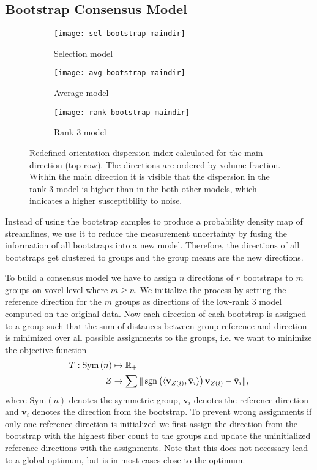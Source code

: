 \subsection{Bootstrap Consensus Model}
\begin{figure*}[t]
	\centering
	\begin{subfigure}[b]{0.33\linewidth}
		\texttt{[image: sel-bootstrap-maindir]}
		\caption{Selection model}
		
	\end{subfigure}
	\begin{subfigure}[b]{0.33\linewidth}
		\texttt{[image: avg-bootstrap-maindir]}
		\caption{Average model}
	\end{subfigure}
	\begin{subfigure}[b]{0.33\linewidth}
		\texttt{[image: rank-bootstrap-maindir]}
		\caption{Rank 3 model}
	\end{subfigure}

	\caption{Redefined orientation dispersion index calculated for the main
		direction (top row). The directions are ordered by volume fraction.
Within the main direction it is visible that the dispersion in the rank $3$
model is higher than in the both other models, which indicates a higher
susceptibility to noise. }
	\label{fig:dispersion}
\end{figure*}


Instead of using the bootstrap samples to produce a probability density map of
streamlines, we use it to reduce the measurement uncertainty by fusing the
information of all bootstraps into a new model. 
Therefore, the directions of all bootstraps get clustered to groups and the
group means are the new directions.

To build a consensus model we have to assign $n$ directions of $r$ bootstraps to $m$ groups on voxel
level where $m \geq n$. We initialize the process by setting the reference
direction for the $m$ groups as directions of
the low-rank $3$ model computed on the original data. Now each
direction of each bootstrap is assigned to a group such that the sum of
distances between group
reference and direction is minimized over all possible assignments to the
groups, i.e. we want to minimize the objective function 
\begin{align}
	T : \text{Sym} \left( n \right) & \mapsto \mathbb{R}_+ \nonumber \\
	Z & \rightarrow \sum \| \operatorname*{sgn} \left( \langle \mathbf{v}_{Z\left( i
	\right)}, \bar{\mathbf{v}}_i \rangle \right) \mathbf{v}_{Z\left( i
	\right)} - \bar{\mathbf{v}}_i\| ,  
\end{align} 
where $\text{Sym}\left( n \right)$ denotes the symmetric group, 
$\bar{\mathbf{v}}_i$ denotes
the reference direction and $\mathbf{v}_i$ denotes the direction from the
bootstrap. To prevent wrong assignments if only one reference
direction is initialized we first assign the direction from the bootstrap with
the  highest fiber count to the
groups and update the uninitialized reference directions with the assignments.
Note that this does not necessary lead to a global optimum, but is in most cases
close to the optimum. 

